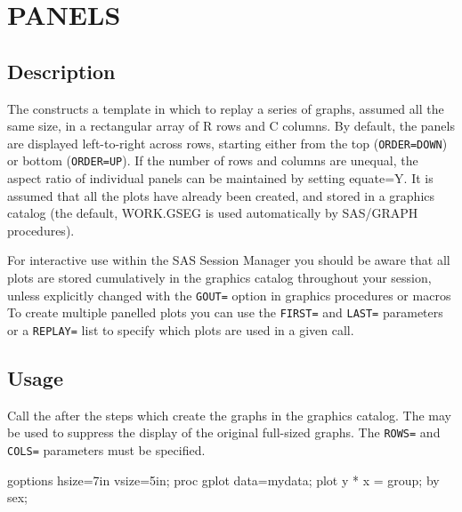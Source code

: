 
\section{PANELS}%


\subsection*{Description}
The  constructs a template in which to replay a series of
graphs, assumed all the same size, in a rectangular array of R
rows and C columns. By default, the panels are displayed
left-to-right across rows,  starting either from the top
(\texttt{ORDER=DOWN}) or bottom (\texttt{ORDER=UP}).  If the number of rows and
columns are unequal, the aspect ratio of individual panels can
be maintained by setting equate=Y.  It is assumed that all the
plots have already been created, and stored in a graphics catalog
(the default, WORK.GSEG is used automatically by SAS/GRAPH
procedures).

For interactive use within the SAS Session Manager you should be
aware that all plots are stored cumulatively in the graphics
catalog throughout your session, unless explicitly changed with
the \texttt{GOUT=} option in graphics procedures or macros  To create multiple
panelled plots you can use the \texttt{FIRST=} and \texttt{LAST=} parameters or a \texttt{REPLAY=}
list to specify which plots are used in a given call.

\subsection*{Usage}
Call the  after the steps which create the graphs in the
graphics catalog.  The  may be used to suppress the
display of the original full-sized graphs.
The \texttt{ROWS=} and \texttt{COLS=} parameters must be specified.
\begin{listing}
  goptions hsize=7in vsize=5in;
  proc gplot data=mydata;
     plot y * x = group;
     by sex;
\end{listing}
\begin{listing}
\end{listing}

